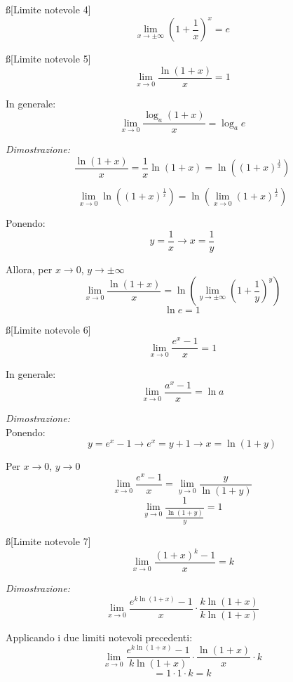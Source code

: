 \documentclass[12pt]{article}
\begin{document}
\ss[Limite notevole 4]
$$ \lim_{x \to \pm \infty} \left(1 + \frac{1}{x}\right)^x = e $$

\ss[Limite notevole 5]
$$ \lim_{x \to 0} \frac{\ln(1 + x)}{x} = 1 $$

In generale:
$$ \lim_{x \to 0} \frac{\log_{a}(1 + x)}{x} = \log_a{e} $$

\textit{Dimostrazione:}
$$ \frac{\ln(1 + x)}{x} = \frac{1}{x}\ln(1 + x) = \ln\left((1+x)^{\frac{1}{x}}\right) $$

$$ \lim_{x \to 0} \ln\left((1+x)^{\frac{1}{x}}\right) = \ln\left(\lim_{x \to 0} (1+x)^{\frac{1}{x}}\right) $$

Ponendo:
$$ y = \frac{1}{x} \rightarrow x = \frac{1}{y} $$

Allora, per $x \to 0$, $y \to \pm\infty$
$$ \lim_{x \to 0} \frac{\ln(1 + x)}{x} = \ln\left(\lim_{y \to \pm\infty} \left(1+\frac{1}{y}\right)^y\right) $$
$$ \ln{e} = 1 $$

\ss[Limite notevole 6]
$$ \lim_{x\to 0} \frac{e^x-1}{x} = 1 $$

In generale:
$$ \lim_{x\to 0} \frac{a^x-1}{x} = \ln{a} $$

\textit{Dimostrazione:} \\
Ponendo:
$$ y = e^x - 1 \rightarrow e^x = y + 1 \rightarrow x = \ln(1 + y) $$

Per $x \to 0$, $y \to 0$
$$ \lim_{x\to 0} \frac{e^x-1}{x} = \lim_{y\to 0} \frac{y}{\ln(1+y)} $$
$$ \lim_{y\to 0} \frac{1}{\frac{\ln(1+y)}{y}} = 1 $$

\ss[Limite notevole 7]
$$ \lim_{x\to 0} \frac{(1+x)^k-1}{x} = k $$

\textit{Dimostrazione:} 
$$ \lim_{x\to 0} \frac{e^{k\ln(1+x)}-1}{x} \cdot \frac{k\ln(1+x)}{k\ln(1+x)} $$

Applicando i due limiti notevoli precedenti:
$$ \lim_{x\to 0} \frac{e^{k\ln(1+x)}-1}{k\ln(1+x)} \cdot \frac{\ln(1+x)}{x} \cdot k $$
$$ = 1 \cdot 1 \cdot k = k $$
\end{document}
